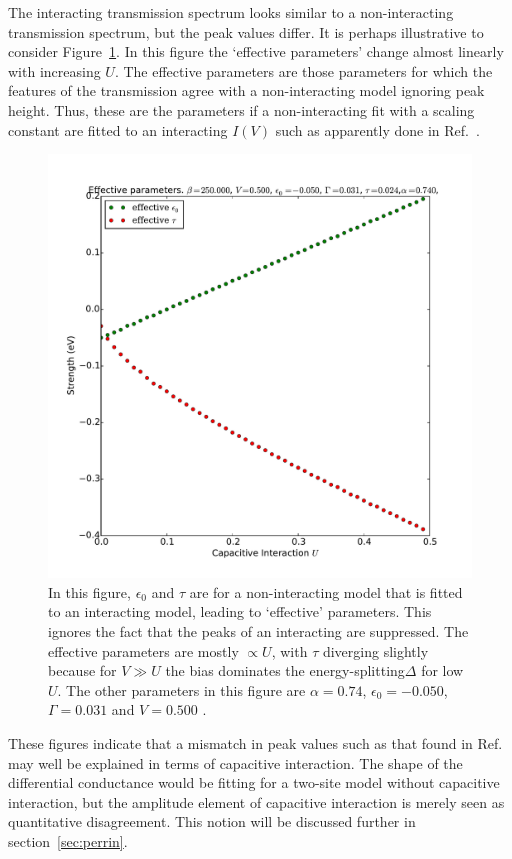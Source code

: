The interacting transmission spectrum looks similar to a non-interacting transmission spectrum, but the peak values differ. It is perhaps illustrative to consider Figure~\ref{fig:perrin_effective}. In this figure the `effective parameters' change almost linearly with increasing $U$. The effective parameters are those parameters for which the features of the transmission agree with a non-interacting model ignoring peak height. Thus, these are the parameters if a non-interacting fit with a scaling constant are fitted to an interacting $I(V)$ such as apparently done in Ref.~\cite{perrinnano}.
\begin{figure}[htb]
    \centering
    \includegraphics[height=.35\textheight]{pdf/trans/perrin_effective.pdf}
    \caption{In this figure, $\epsilon_0$ and $\tau$ are for a non-interacting model that is fitted to an interacting model, leading to `effective' parameters. This ignores the fact that the peaks of an interacting are suppressed. The effective parameters are mostly $\propto U$, with $\tau$ diverging slightly because for $V\gg U$ the bias dominates the energy-splitting$\Delta$ for low $U$. The other parameters in this figure are $\alpha=0.74$, $\epsilon_0 = -0.050$, $\Gamma = 0.031$ and $V=0.500$ .}
    \label{fig:perrin_effective}
\end{figure}


These figures indicate that a mismatch in peak values such as that found in Ref.~\cite{perrinnano} may well be explained in terms of capacitive interaction. The shape of the differential conductance would be fitting for a two-site model without capacitive interaction, but the amplitude element of capacitive interaction is merely seen as quantitative disagreement. This notion will be discussed further in section~\ref{sec:perrin}. 

